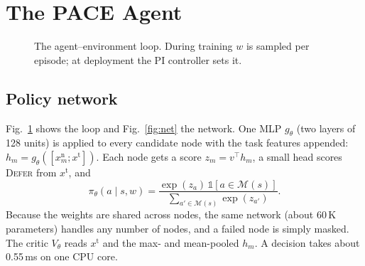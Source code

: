 \documentclass[conference]{IEEEtran}
\begin{document}
\section{The PACE Agent}\label{sec:method}

\begin{figure}[t]
\centering
{}
\caption{The agent--environment loop. During training $w$ is sampled per episode; at deployment the PI controller sets it.}
\label{fig:loop}
\end{figure}

\subsection{Policy network}
Fig.~\ref{fig:loop} shows the loop and Fig.~\ref{fig:net} the network. One MLP $g_\theta$ (two layers of 128 units) is applied to every candidate node with the task features appended: $h_m=g_\theta([x^{\mathrm n}_m;x^{\mathrm t}])$. Each node gets a score $z_m=v^\top h_m$, a small head scores \textsc{Defer} from $x^{\mathrm t}$, and
\begin{equation}
\pi_\theta(a\mid s,w)=\frac{\exp(z_a)\,\mathbb 1[a\in\mathcal M(s)]}{\sum_{a'\in\mathcal M(s)}\exp(z_{a'})}. \label{eq:policy}
\end{equation}
Because the weights are shared across nodes, the same network (about 60\,K parameters) handles any number of nodes, and a failed node is simply masked. The critic $V_\theta$ reads $x^{\mathrm t}$ and the max- and mean-pooled $h_m$. A decision takes about 0.55\,ms on one CPU core.
\end{document}
